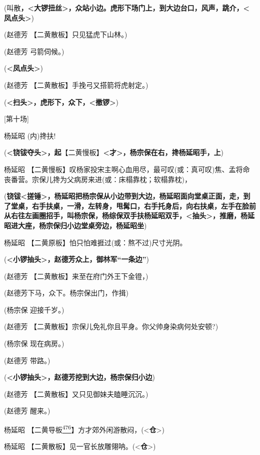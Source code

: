 (叫散\textbf{，\textless{}大锣扭丝\textgreater{}，众站小边。虎形下场门上，到大边台口，风声，跳介，\textless{}凤点头\textgreater{}})

(赵德芳 【二黄散板】只见猛虎下山林。)

(赵德芳 弓箭伺候。)

(\textbf{\textless{}凤点头\textgreater{}})

(赵德芳 【二黄散板】手挽弓又搭箭将虎射定。)

(\textbf{\textless{}扫头\textgreater{}，虎形下，众下，\textless{}撤锣\textgreater{}})

{[}第十场{]}

杨延昭 (内)搀扶!

(\textbf{\textless{}铙钹夺头\textgreater{}，起}【二黄慢板】\textbf{\textless{}才\textgreater{}，杨宗保在右，搀杨延昭手，上})

杨延昭
【二黄慢板】叹杨家投宋主啊心血用尽，最可叹(或：真可叹)焦、孟将命丧番营。宗保儿搀为父病房来进(或：床榻靠枕；软榻靠枕)，

(\textbf{铙钹\textless{}搓锤\textgreater{}，杨延昭把杨宗保从小边带到大边，杨延昭面向堂桌正面，走，到了堂桌，右手扶桌，一滑，左转身，甩髯口，右手托身后，向右扶桌，左手在脸前从右往左画圈招手，叫杨宗保，杨综保双手扶杨延昭双手，\textless{}抽头\textgreater{}，推磨，杨延昭进大座，杨宗保归小边堂桌旁边，杨延昭坐})

杨延昭 【二黄原板】怕只怕难捱过(或：熬不过)尺寸光阴。

(\textbf{\textless{}小锣抽头\textgreater{}，赵德芳众上，御林军``一条边''})

(赵德芳 【二黄散板】来至在府门外王下金镫，)

(赵德芳下马，众下。杨宗保出门，作揖)

(杨宗保 迎接千岁。)

(赵德芳 【二黄散板】宗保儿免礼你且平身。你父帅身染病何处安顿?)

(杨宗保 现在病房。)

(赵德芳 带路。)

(\textbf{\textless{}小锣抽头\textgreater{}，赵德芳挖到大边，杨宗保归小边})

(赵德芳 【二黄散板】又只见御妹夫瞌睡沉沉。)

(赵德芳 醒来。)

杨延昭
【二黄导板\protect\hyperlink{fn476}{\textsuperscript{476}}】方才郊外闲游散闷，(\textless{}\textbf{仓}\textgreater{})

杨延昭
【二黄散板】见一官长放雕翎呐。(\textless{}\textbf{仓}\textgreater{})


